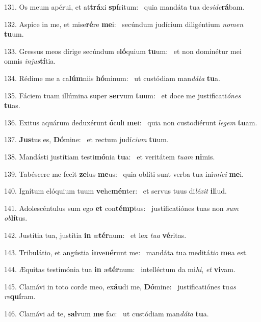 131. Os meum apérui, et at\textbf{trá}xi \textbf{spí}ritum: \ast\  quia mandáta tua de\textit{si}\textit{de}\textbf{rá}bam.\

132. Aspice in me, et mise\textbf{ré}re \textbf{me}i: \ast\  secúndum judícium diligéntium \textit{no}\textit{men} \textbf{tu}um.\

133. Gressus meos dírige secúndum e\textbf{ló}quium \textbf{tu}um: \ast\  et non dominétur mei omnis \textit{in}\textit{jus}\textbf{tí}tia.\

134. Rédime me a ca\textbf{lúm}niis \textbf{hó}minum: \ast\  ut custódiam man\textit{dá}\textit{ta} \textbf{tu}a.\

135. Fáciem tuam illúmina super \textbf{ser}vum \textbf{tu}um: \ast\  et doce me justificati\textit{ó}\textit{nes} \textbf{tu}as.\

136. Exitus aquárum deduxérunt \textbf{ó}culi \textbf{me}i: \ast\  quia non custodiérunt \textit{le}\textit{gem} \textbf{tu}am.\

137. \textbf{Jus}tus es, \textbf{Dó}mine: \ast\  et rectum judí\textit{ci}\textit{um} \textbf{tu}um.\

138. Mandásti justítiam testi\textbf{mó}nia \textbf{tu}a: \ast\  et veritátem \textit{tu}\textit{am} \textbf{ni}mis.\

139. Tabéscere me fecit \textbf{ze}lus \textbf{me}us: \ast\  quia oblíti sunt verba tua ini\textit{mí}\textit{ci} \textbf{me}i.\

140. Ignítum elóquium tuum \textbf{ve}he\textbf{mén}ter: \ast\  et servus tuus di\textit{lé}\textit{xit} \textbf{il}lud.\

141. Adolescéntulus sum ego \textbf{et} con\textbf{témp}tus: \ast\  justificatiónes tuas non \textit{sum} \textit{ob}\textbf{lí}tus.\

142. Justítia tua, justítia \textbf{in} æ\textbf{tér}num: \ast\  et lex \textit{tu}\textit{a} \textbf{vé}ritas.\

143. Tribulátio, et angústia \textbf{in}ve\textbf{né}runt me: \ast\  mandáta tua meditá\textit{ti}\textit{o} \textbf{me}a est.\

144. Æquitas testimónia tua \textbf{in} æ\textbf{tér}num: \ast\  intelléctum da mi\textit{hi}, \textit{et} \textbf{vi}vam.\

145. Clamávi in toto corde meo, ex\textbf{áu}di me, \textbf{Dó}mine: \ast\  justificatiónes tu\textit{as} \textit{re}\textbf{quí}ram.\

146. Clamávi ad te, \textbf{sal}vum \textbf{me} fac: \ast\  ut custódiam man\textit{dá}\textit{ta} \textbf{tu}a.\

